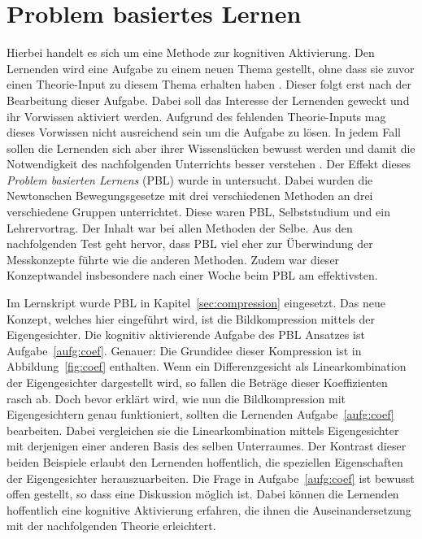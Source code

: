 \section{Problem basiertes Lernen}
Hierbei handelt es sich um eine Methode zur kognitiven Aktivierung.
Den Lernenden wird eine Aufgabe zu einem neuen Thema gestellt, ohne dass sie zuvor einen Theorie-Input zu diesem Thema erhalten haben \cite{Loyens2015}.
Dieser folgt erst nach der Bearbeitung dieser Aufgabe.
Dabei soll das Interesse der Lernenden geweckt und ihr Vorwissen aktiviert werden.
Aufgrund des fehlenden Theorie-Inputs mag dieses Vorwissen nicht ausreichend sein um die Aufgabe zu lösen.
In jedem Fall sollen die Lernenden sich aber ihrer Wissenslücken bewusst werden und damit die Notwendigkeit des nachfolgenden Unterrichts besser verstehen \cite{Loyens2015}.
Der Effekt dieses \textit{Problem basierten Lernens} (PBL) wurde in \cite{Loyens2015} untersucht.
Dabei wurden die Newtonschen Bewegungsgesetze mit drei verschiedenen Methoden an drei verschiedene Gruppen unterrichtet.
Diese waren PBL, Selbststudium und ein Lehrervortrag.
Der Inhalt war bei allen Methoden der Selbe.
Aus den nachfolgenden Test geht hervor, dass PBL viel eher zur Überwindung der Messkonzepte führte wie die anderen Methoden.
Zudem war dieser Konzeptwandel insbesondere nach einer Woche beim PBL am effektivsten.

Im Lernskript wurde PBL in Kapitel~\ref{sec:compression} eingesetzt.
Das neue Konzept, welches hier eingeführt wird, ist die Bildkompression mittels der Eigengesichter.
Die kognitiv aktivierende Aufgabe des PBL Ansatzes ist Aufgabe~\ref{aufg:coef}.
Genauer: Die Grundidee dieser Kompression ist in Abbildung~\ref{fig:coef} enthalten.
Wenn ein Differenzgesicht als Linearkombination der Eigengesichter dargestellt wird, so fallen die Beträge dieser Koeffizienten rasch ab.
Doch bevor erklärt wird, wie nun die Bildkompression mit Eigengesichtern genau funktioniert, sollten die Lernenden Aufgabe~\ref{aufg:coef} bearbeiten.
Dabei vergleichen sie die Linearkombination mittels Eigengesichter mit derjenigen einer anderen Basis des selben Unterraumes.
Der Kontrast dieser beiden Beispiele erlaubt den Lernenden hoffentlich, die speziellen Eigenschaften der Eigengesichter herauszuarbeiten.
Die Frage in Aufgabe~\ref{aufg:coef} ist bewusst offen gestellt, so dass eine Diskussion möglich ist.
Dabei können die Lernenden hoffentlich eine kognitive Aktivierung erfahren, die ihnen die Auseinandersetzung mit der nachfolgenden Theorie erleichtert.